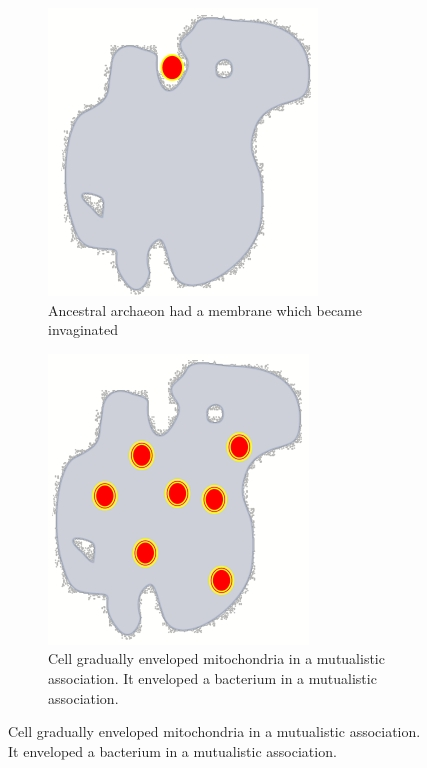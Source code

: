 \documentclass[]{article}
\begin{document}
\begin{figure}[H]
	\caption{Origin of membranes and structures: Outside-in Model}\label{fig:outside:in}
	\begin{subfigure}[b]{0.45\textwidth}
		\caption{Ancestral archaeon had a membrane which became invaginated }\label{fig:outside:in1}
		\includegraphics[width=\textwidth]{OutsideIn1}
	\end{subfigure}
	\begin{subfigure}[b]{0.45\textwidth}
		\caption{ Cell gradually enveloped mitochondria in a mutualistic association. It enveloped a bacterium in a mutualistic association.}\label{fig:outside:in2}
		\includegraphics[width=\textwidth]{OutsideIn2}

\end{subfigure}
\end{figure}
\end{document}
